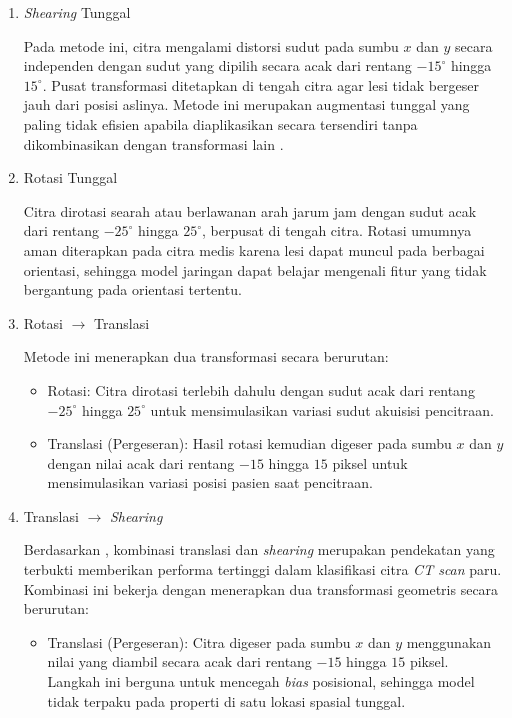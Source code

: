 \begin{enumerate}
	\item \textit{Shearing} Tunggal
	
	Pada metode ini, citra mengalami distorsi sudut pada sumbu $x$ dan $y$ secara independen 
	dengan sudut yang dipilih secara acak dari rentang $-15^\circ$ hingga $15^\circ$. Pusat 
	transformasi ditetapkan di tengah citra agar lesi tidak bergeser jauh dari posisi aslinya. 
	Metode ini merupakan augmentasi tunggal yang paling tidak efisien apabila diaplikasikan 
	secara tersendiri tanpa dikombinasikan dengan transformasi lain 
	\autocite{goceri2023medical}.
	
	\item Rotasi Tunggal
	
	Citra dirotasi searah atau berlawanan arah jarum jam dengan sudut acak dari rentang 
	$-25^\circ$ hingga $25^\circ$, berpusat di tengah citra. Rotasi umumnya aman diterapkan 
	pada citra medis karena lesi dapat muncul pada berbagai orientasi, sehingga model 
	jaringan dapat belajar mengenali fitur yang tidak bergantung pada orientasi tertentu.
	
	\item Rotasi $\to$ Translasi
	
	Metode ini menerapkan dua transformasi secara berurutan:
	\begin{itemize}
		\item Rotasi: Citra dirotasi terlebih dahulu dengan sudut acak dari rentang 
		$-25^\circ$ hingga $25^\circ$ untuk mensimulasikan variasi sudut akuisisi pencitraan.
		
		\item Translasi (Pergeseran): Hasil rotasi kemudian digeser pada sumbu $x$ 
		dan $y$ dengan nilai acak dari rentang $-15$ hingga $15$ piksel untuk mensimulasikan 
		variasi posisi pasien saat pencitraan.
	\end{itemize}
	
	\item Translasi $\to$ \textit{Shearing}
	
	Berdasarkan \autocite{goceri2023medical}, kombinasi translasi dan \textit{shearing} 
	merupakan pendekatan yang terbukti memberikan performa tertinggi dalam klasifikasi citra 
	\textit{CT scan} paru. Kombinasi ini bekerja dengan menerapkan dua transformasi geometris 
	secara berurutan:
	\begin{itemize}
		\item Translasi (Pergeseran): Citra digeser pada sumbu $x$ dan $y$ 
		menggunakan nilai yang diambil secara acak dari rentang $-15$ hingga $15$ piksel. 
		Langkah ini berguna untuk mencegah \textit{bias} posisional, sehingga model tidak 
		terpaku pada properti di satu lokasi spasial tunggal.
		

\end{itemize}
\end{enumerate}
